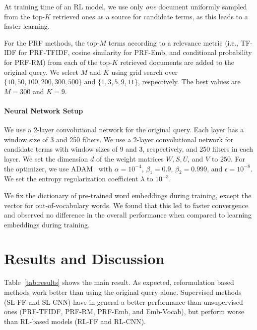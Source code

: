 \documentclass[11pt,letterpaper]{article}
\begin{document}
At training time of an RL model, we use only \textit{one} document uniformly sampled from the top-$K$ retrieved ones as a source for candidate terms, as this leads to a faster learning.

For the PRF methods, the top-$M$ terms according to a relevance metric (i.e., TF-IDF for PRF-TFIDF, cosine similarity for PRF-Emb, and conditional probability for PRF-RM) from each of the top-$K$ retrieved documents are added to the original query. We select $M$ and $K$ using grid search over $\{10, 50, 100, 200, 300, 500\}$ and $\{1, 3, 5, 9, 11\}$, respectively. The best values are $M=300$ and $K=9$.


\paragraph{Neural Network Setup} 
We use a 2-layer convolutional network for the original query. Each layer has a window size of 3 and 250 filters. We use a 2-layer convolutional network for candidate terms with window sizes of 9 and 3, respectively, and 250 filters in each layer. We set the dimension $d$ of the weight matrices $W,S,U$, and $V$ to $250$. For the optimizer, we use ADAM~\cite{kingma2014adam} with $\alpha=10^{-4}$, $\beta_1=0.9$, $\beta_2=0.999$, and $\epsilon=10^{-8}$. We set the entropy regularization coefficient $\lambda$ to $10^{-3}$.

We fix the dictionary of pre-trained word embeddings during training, except the vector for out-of-vocabulary words. We found that this led to faster convergence and observed no difference in the overall performance when compared to learning embeddings during training.

\section{Results and Discussion}

Table~\ref{tab:results} shows the main result. As expected, reformulation based methods work better than using the original query alone. Supervised methods (SL-FF and SL-CNN) have in general a better performance than unsupervised ones (PRF-TFIDF, PRF-RM, PRF-Emb, and Emb-Vocab), but perform worse than RL-based models (RL-FF and RL-CNN).
\end{document}
